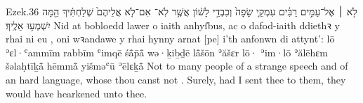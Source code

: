 \begin{example}{Ezek.}{3}{6}{}{}
	\quoling
	{לֹ֣א ׀ אֶל־עַמִּ֣ים רַבִּ֗ים עִמְקֵ֤י שָׂפָה֙ וְכִבְדֵ֣י לָשׁ֔וֹן אֲשֶׁ֥ר לֹֽא־  אִם־לֹ֤א אֲלֵיהֶם֙ שְׁלַחְתִּ֔יךָ הֵ֖מָּה יִשְׁמְע֥וּ אֵלֶֽיךָ׃}
	{Nid at bobloedd lawer o iaith anhyſbus, ac o dafod-iaith ddiethꝛ y rhai ni  eu , oni wꝛandawe y rhai hynny arnat [pe] i’th anfonwn di attynt’:}
	{lō ʾɛl·ʿammīm rabbīm ʿimqē śå̄p̄å̄ wə·ḵiḇḏē lå̄šōn ʾăšɛr lō·  ʾim·lō ʾălēhɛm šəlaḥtīḵå̄ hēmmå̄ yišməʿū ʾēlɛḵå̄}
	{Not to many people of a strange speech and of an hard language, whose  thou canst not . Surely, had I sent thee to them, they would have hearkened unto thee.}
\end{example}









